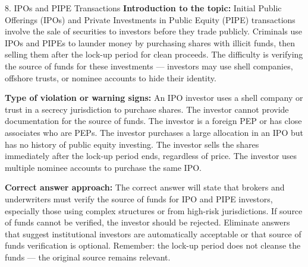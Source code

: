 \documentclass[11pt,a4paper]{beamer}
\begin{document}
\begin{frame}{8. IPOs and PIPE Transactions}
\tiny
\noindent\textbf{Introduction to the topic:} Initial Public Offerings (IPOs) and Private Investments in Public Equity (PIPE) transactions involve the sale of securities to investors before they trade publicly. Criminals use IPOs and PIPEs to launder money by purchasing shares with illicit funds, then selling them after the lock-up period for clean proceeds. The difficulty is verifying the source of funds for these investments — investors may use shell companies, offshore trusts, or nominee accounts to hide their identity.

\vspace{0.1cm}
\noindent\textbf{Type of violation or warning signs:} An IPO investor uses a shell company or trust in a secrecy jurisdiction to purchase shares. The investor cannot provide documentation for the source of funds. The investor is a foreign PEP or has close associates who are PEPs. The investor purchases a large allocation in an IPO but has no history of public equity investing. The investor sells the shares immediately after the lock-up period ends, regardless of price. The investor uses multiple nominee accounts to purchase the same IPO.

\vspace{0.1cm}
\noindent\textbf{Correct answer approach:} The correct answer will state that brokers and underwriters must verify the source of funds for IPO and PIPE investors, especially those using complex structures or from high-risk jurisdictions. If source of funds cannot be verified, the investor should be rejected. Eliminate answers that suggest institutional investors are automatically acceptable or that source of funds verification is optional. Remember: the lock-up period does not cleanse the funds — the original source remains relevant.
\end{frame}
\end{document}
